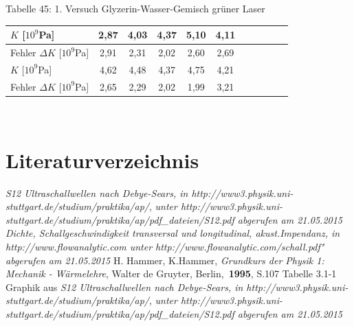 \documentclass[fontsize=12pt]{scrartcl}
\begin{document}
~\\
~\\
Tabelle 45: 1. Versuch Glyzerin-Wasser-Gemisch grüner Laser\\
\begin{tabular}{|l|c|c|c|c|c|c|c|c|c|c|} \hline

 $K$ [$10^9$Pa] & 2,87 & 4,03 & 4,37 & 5,10 & 4,11  \\ \hline
Fehler $\Delta K$ [$10^9$Pa] & 2,91  & 
2,31 & 
2,02 & 
2,60 & 
2,69
 \\ \hline
 $K$ [$10^9$Pa]  & 4,62 & 4,48 & 4,37 & 4,75 & 4,21  \\ \hline
Fehler $\Delta K$ [$10^9$Pa] &  2,65 & 
2,29 & 
2,02 & 
1,99 & 
3,21
\\ \hline
\end{tabular} \\


\section{Literaturverzeichnis}

\begin{thebibliography}{xxxxxxxx}
		\textit{\glqq S12 Ultraschallwellen nach Debye-Sears\grqq , in http://www3.physik.uni-stuttgart.de/studium/praktika/ap/},\textit{ unter 										http://www3.physik.uni-stuttgart.de/studium/praktika/ap/pdf\_dateien/S12.pdf abgerufen am 21.05.2015}
    \textit{\glqq Dichte, Schallgeschwindigkeit transversal und longitudinal, akust.Impendanz\grqq, in http://www.flowanalytic.com unter 
                          http://www.flowanalytic.com/schall.pdf" abgerufen am 21.05.2015}
     H. Hammer, K.Hammer, \textit{ Grundkurs der Physik 1: Mechanik - Wärmelehre}, Walter de Gruyter, Berlin,~\textbf{1995}, S.107 				                           Tabelle 3.1-1
      Graphik aus \textit{\glqq S12 Ultraschallwellen nach Debye-Sears\grqq , in http://www3.physik.uni-stuttgart.de/studium/praktika/ap/},											\textit{ unter 	http://www3.physik.uni-stuttgart.de/studium/praktika/ap/pdf\_dateien/S12.pdf abgerufen am 21.05.2015}
\end{thebibliography}
\newpage
\end{document}

